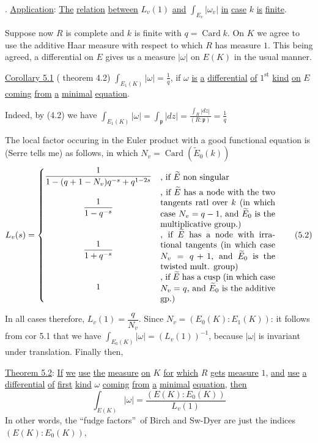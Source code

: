 
\begingroup
\makeatletter\tagsleft@true{}. \uline{Application}: \uline{The} \uline{relation} \uline{between} $L_v(1)$ \uline{and} $\int_{E_v}|\omega_v|$ \uline{in} \uline{case} $k$ \uline{is} \uline{finite}.

Suppose now $R$ is complete and $k$ is finite with $q=\operatorname{Card} k$. On $K$ we agree to use the additive Haar measure with respect to which $R$ has measure $1$. This being agreed, a differential \inserted{$\omega$} on $E$ gives us a measure $|\omega|$ on $E(K)$ in the usual manner.

\uline{Corollary 5.1} ( theorem 4.2) $\displaystyle\int_{E_1(K)}|\omega|=\frac{1}{q}$, if $\omega$ \uline{is} \uline{a} \uline{differential} \uline{of} $1^{\mathrm{st}}$ \uline{kind} \uline{on} $E$ \uline{coming} \uline{from} \uline{a} \uline{minimal} \uline{equation}.

Indeed, by (4.2) we have $\displaystyle\int_{E_1(K)}|\omega|=\int_{\mathfrak p}|dz|=\frac{\int_R|dz|}{(R:\mathfrak p)}=\frac{1}{q}$

The local factor occuring in the Euler product with a good functional equation is (Serre tells me) as follows, in which $N_v=\operatorname{Card}(\widetilde E_0(k))$
{\small
\[
L_v(s)=\left\{
\begin{array}{@{}c@{\quad}l@{}}
\dfrac{1}{1-(q+1-N_v)q^{-s}+q^{1-2s}}
 & \parbox{.39\linewidth}{, if $\widetilde E$ non singular}\\[1.0ex]
\dfrac{1}{1-q^{-s}}
 & \parbox{.39\linewidth}{, if $\widetilde E$ has a node with the two tangents ratl over $k$ (in which case $N_v=q-1$, and $\widetilde E_0$ is the multiplicative group.)}\\[1.0ex]
\dfrac{1}{1+q^{-s}}
 & \parbox{.39\linewidth}{, if $\widetilde E$ has a node with irrational tangents (in which case $N_v=q+1$, and $\widetilde E_0$ is the twisted mult. group)}\\[1.0ex]
1 & \parbox{.39\linewidth}{, if $\widetilde E$ has a cusp (in which case $N_v=q$, and $\widetilde E_0$ is the additive gp.)}
\end{array}\right.
\tag*{(5.2)}
\]
}

In all cases therefore, $L_v(1)=\dfrac{q}{N_v}$. Since $N_v=(E_0(K):E_1(K))$: it follows from cor 5.1 that we have $\displaystyle\int_{E_0(K)}|\omega|=(L_v(1))^{-1}$, because $|\omega|$ is invariant under translation. Finally then,

\uline{Theorem 5.2}: \uline{If} \uline{we} \uline{use} \uline{the} \uline{measure} \uline{on} $K$ \uline{for} \uline{which} $R$ \uline{gets} \uline{measure} $1$, \uline{and} \uline{use} \uline{a} \uline{differential} \uline{of} \uline{first} \uline{kind} $\omega$ \uline{coming} \uline{from} \uline{a} \uline{minimal} \uline{equation}, \uline{then}
\[
\int_{E(K)}|\omega|=\frac{(E(K):E_0(K))}{L_v(1)}
\tag*{(5.3)}
\]
In other words, the ``fudge factors''\ of Birch and Sw-Dyer are just the indices $(E(K):E_0(K))$,
\endgroup


